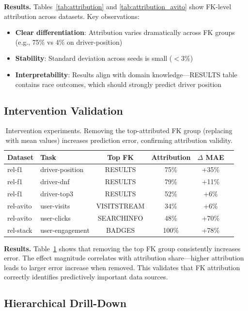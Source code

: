 \documentclass{article}
\begin{document}
\textbf{Results.} Tables~\ref{tab:attribution} and \ref{tab:attribution_avito} show
FK-level attribution across datasets. Key observations:
\begin{itemize}
    \item \textbf{Clear differentiation}: Attribution varies dramatically across FK groups
    (e.g., 75\% vs 4\% on driver-position)
    \item \textbf{Stability}: Standard deviation across seeds is small ($< 3\%$)
    \item \textbf{Interpretability}: Results align with domain knowledge---RESULTS
    table contains race outcomes, which should strongly predict driver position
\end{itemize}

\subsection{Intervention Validation}

\begin{table}[t]
\centering
\caption{Intervention experiments. Removing the top-attributed FK group (replacing
with mean values) increases prediction error, confirming attribution validity.}
\label{tab:intervention}
\begin{tabular}{llcccc}
\toprule
Dataset & Task & Top FK & Attribution & $\Delta$ MAE \\
\midrule
rel-f1 & driver-position & RESULTS & 75\% & +35\% \\
rel-f1 & driver-dnf & RESULTS & 79\% & +11\% \\
rel-f1 & driver-top3 & RESULTS & 52\% & +6\% \\
rel-avito & user-visits & VISITSTREAM & 34\% & +6\% \\
rel-avito & user-clicks & SEARCHINFO & 48\% & +70\% \\
rel-stack & user-engagement & BADGES & 100\% & +78\% \\
\bottomrule
\end{tabular}
\end{table}

\textbf{Results.} Table~\ref{tab:intervention} shows that removing the top FK group
consistently increases error. The effect magnitude correlates with attribution share---higher
attribution leads to larger error increase when removed. This validates that FK attribution
correctly identifies predictively important data sources.

\subsection{Hierarchical Drill-Down}
\end{document}
